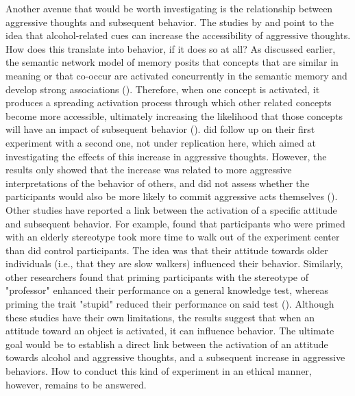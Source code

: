 \documentclass[serif, authordate, twocolumn, empirical]{jote-article}
\begin{document}
Another avenue that would be worth investigating is the relationship between aggressive thoughts and subsequent behavior. The studies by \textcite{BartholowHeinz2006} and \textcite{SubraMullerBegueLBushmanDelmas2010} point to the idea that alcohol-related cues can increase the accessibility of aggressive thoughts. How does this translate into behavior, if it does so at all? As discussed earlier, the semantic network model of memory posits that concepts that are similar in meaning or that co-occur are activated concurrently in the semantic memory and develop strong associations (\cite{AndersonJrJBartholow1998}). Therefore, when one concept is activated, it produces a spreading activation process through which other related concepts become more accessible, ultimately increasing the likelihood that those concepts will have an impact of subsequent behavior (). \textcite{BartholowHeinz2006} did follow up on their first experiment with a second one, not under replication here, which aimed at investigating the effects of this increase in aggressive thoughts. However, the results only showed that the increase was related to more aggressive interpretations of the behavior of others, and did not assess whether the participants would also be more likely to commit aggressive acts themselves (\cite{SubraMullerBegueLBushmanDelmas2010}). Other studies have reported a link between the activation of a specific attitude and subsequent behavior. For example, \textcite{BarghChenBurrows1996} found that participants who were primed with an elderly stereotype took more time to walk out of the experiment center than did control participants. The idea was that their attitude towards older individuals (i.e., that they are slow walkers) influenced their behavior. Similarly, other researchers found that priming participants with the stereotype of "professor" enhanced their performance on a general knowledge test, whereas priming the trait "stupid" reduced their performance on said test (). Although these studies have their own limitations, the results suggest that when an attitude toward an object is activated, it can influence behavior. The ultimate goal would be to establish a direct link between the activation of an attitude towards alcohol and aggressive thoughts, and a subsequent increase in aggressive behaviors. How to conduct this kind of experiment in an ethical manner, however, remains to be answered.


{}
\end{document}
